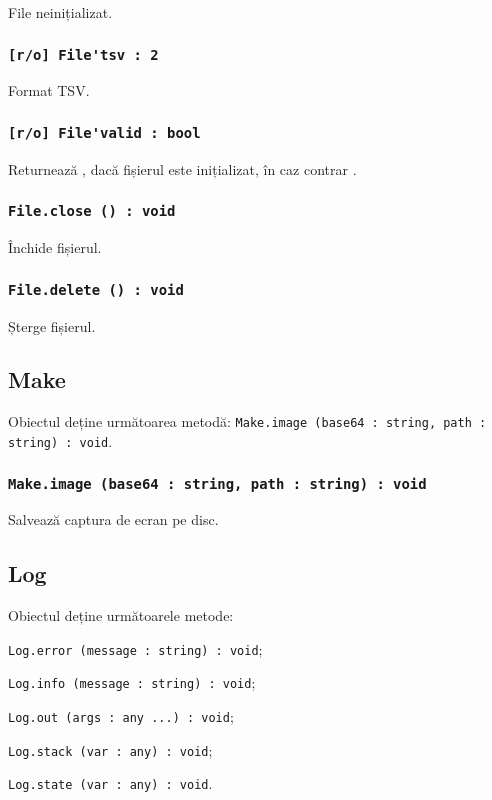 File neinițializat.

\subsubsection{\lstinline|[r/o] File'tsv : 2|}

Format TSV.

\subsubsection{\lstinline|[r/o] File'valid : bool|}

Returnează \true, dacă fișierul este inițializat, în caz contrar \false.

\subsubsection{\lstinline|File.close () : void|}

Închide fișierul.

\subsubsection{\lstinline|File.delete () : void|}

Șterge fișierul.

\subsection{{\color{orange} Make}}

Obiectul \make{} deține următoarea metodă: \lstinline|Make.image (base64 : string, path : string) : void|.

\subsubsection{\lstinline|Make.image (base64 : string, path : string) : void|}

Salvează captura de ecran pe disc.

\subsection{{\color{orange} Log}}

Obiectul \logtype{} deține următoarele metode:
\begin{icItems}
	\item \lstinline|Log.error (message : string) : void|;
	\item \lstinline|Log.info (message : string) : void|;
	\item \lstinline|Log.out (args : any ...) : void|;
	\item \lstinline|Log.stack (var : any) : void|;
	\item \lstinline|Log.state (var : any) : void|.
\end{icItems}

